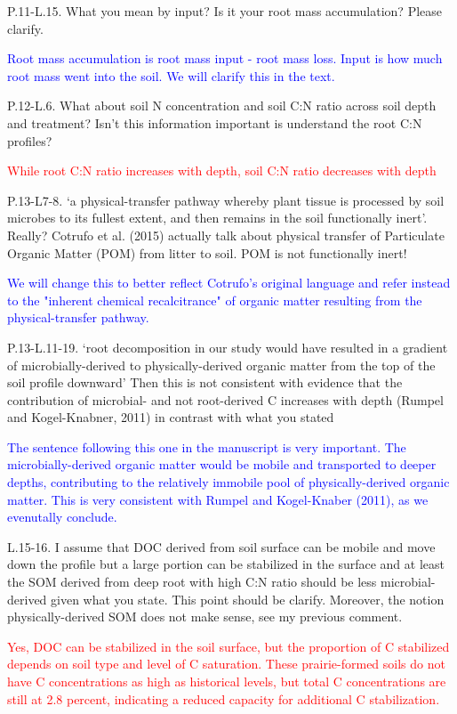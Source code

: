 \documentclass[]{article}
\begin{document}
P.11-L.15. What you mean by input? Is it your root mass accumulation?
Please clarify.

\textcolor{blue}{Root mass accumulation is root mass input - root mass loss. Input is how much root mass went into the soil. We will clarify this in the text.}

P.12-L.6. What about soil N concentration and soil C:N ratio across soil
depth and treatment? Isn't this information important is understand the
root C:N profiles?

\textcolor{red}{While root C:N ratio increases with depth, soil C:N ratio decreases with depth}

P.13-L7-8. `a physical-transfer pathway whereby plant tissue is
processed by soil microbes to its fullest extent, and then remains in
the soil functionally inert'. Really? Cotrufo et al. (2015) actually
talk about physical transfer of Particulate Organic Matter (POM) from
litter to soil. POM is not functionally inert!

\textcolor{blue}{We will change this to better reflect Cotrufo's original language and refer instead to the "inherent chemical recalcitrance" of organic matter resulting from the physical-transfer pathway.}

P.13-L.11-19. `root decomposition in our study would have resulted in a
gradient of microbially-derived to physically-derived organic matter
from the top of the soil profile downward' Then this is not consistent
with evidence that the contribution of microbial- and not root-derived C
increases with depth (Rumpel and Kogel-Knabner, 2011) in contrast with
what you stated

\textcolor{blue}{The sentence following this one in the manuscript is very important. The microbially-derived organic matter would be mobile and transported to deeper depths, contributing to the relatively immobile pool of physically-derived organic matter. This is very consistent with Rumpel and Kogel-Knaber (2011), as we evenutally conclude.}

L.15-16. I assume that DOC derived from soil surface can be mobile and
move down the profile but a large portion can be stabilized in the
surface and at least the SOM derived from deep root with high C:N ratio
should be less microbial-derived given what you state. This point should
be clarify. Moreover, the notion physically-derived SOM does not make
sense, see my previous comment.

\textcolor{red}{Yes, DOC can be stabilized in the soil surface, but the proportion of C stabilized depends on soil type and level of C saturation. These prairie-formed soils do not have C concentrations as high as historical levels, but total C concentrations are still at 2.8 percent, indicating a reduced capacity for additional C stabilization.}
\end{document}
